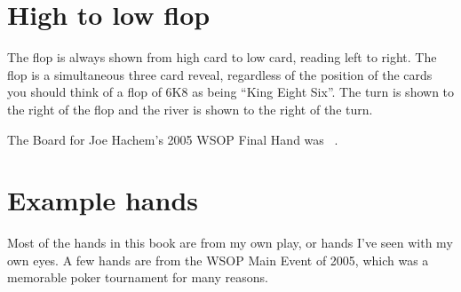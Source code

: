 \section*{High to low flop}

The flop is always shown from high card to low card, reading left to
right. The flop is a simultaneous three card reveal, regardless of the
position of the cards you should think of a flop of 6K8 as being
``King Eight Six''. The turn is shown to the right of the flop and the
river is shown to the right of the turn.

The Board for Joe Hachem's 2005 WSOP Final Hand was
\sixh\fived\fourd\As\fourc\ .

\section*{Example hands}

Most of the hands in this book are from my own play, or hands I've
seen with my own eyes. A few hands are from the WSOP Main Event
of 2005, which was a memorable poker tournament for many reasons.

